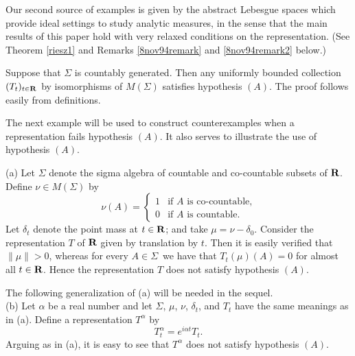 Our second source of examples is given by
the abstract Lebesgue spaces which provide 
ideal settings to study analytic measures, in the sense that
the main results of this paper hold with very relaxed conditions on the 
representation.  (See Theorem \ref{riesz1} and Remarks
\ref{8nov94remark} and \ref{8nov94remark2} below.)
\begin{ex2}
{\rm Suppose that $\Sigma$ is countably generated.  Then 
any uniformly bounded collection $(T_t)_{t\in\R}$  
by isomorphisms of $M(\Sigma)$ satisfies hypothesis $(A)$.  
The proof follows easily from definitions.
}
\label{ex2}
\end{ex2}
The next example will be used to 
construct counterexamples 
when a representation 
fails hypothesis $(A)$.  It also serves to 
illustrate the use of hypothesis $(A)$.
\begin{ex3}
{\rm
(a)  Let $\Sigma$ denote the sigma algebra of 
countable and co-countable subsets of $\R$.  
Define $\nu\in M(\Sigma)$ by
$$
\nu (A)=\left\{
\begin{array}{ll}
1 & \mbox{if $A$ is co-countable,}\\
0 &  \mbox{if $A$ is countable.}
\end{array}
\right.
$$
Let $\delta_t$ denote the point mass at $t\in \R$; 
and take $\mu=\nu-\delta_0$.  Consider the 
representation $T$ of $\R$ given by translation by $t$.  
Then it is easily verified that 
$\|\mu\|>0$, whereas for every $A\in \Sigma$\ we have that 
$T_t(\mu)(A)=0$ 
for almost all $t\in \R$.
Hence the 
representation $T$ does not satisfy hypothesis $(A)$.

The following generalization of (a) will be 
needed in the sequel.\\
(b)  Let $\alpha$ be a real number and let 
$\Sigma$, $\mu$, $\nu$, $\delta_t$, and $T_t$ 
have the same meanings as in (a).  Define a 
representation $T^\alpha$ by
$$T_t^\alpha = e^{i\alpha t}T_t.$$ 
Arguing as in (a), it is easy to see that $T^\alpha$ 
does not satisfy hypothesis $(A)$.
}
\label{ex3}
\end{ex3}


